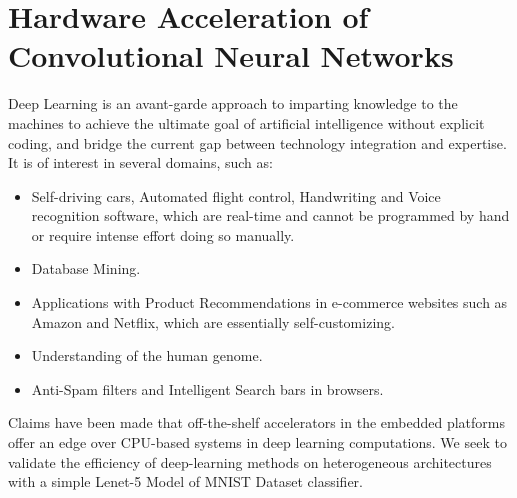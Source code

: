 \chapter{Hardware Acceleration of Convolutional Neural Networks}
\label{ch3_cnn}
Deep Learning is an avant-garde approach to imparting knowledge to the machines to achieve the ultimate goal of artificial intelligence without explicit coding, and bridge the current gap between technology integration and expertise. It is of interest in several domains\cite{wiki_ml}, such as:
\begin{itemize}
\item Self-driving cars, Automated flight control, Handwriting and Voice recognition software, which are real-time and cannot be programmed by hand or require intense effort doing so manually.
\item Database Mining.
\item Applications with Product Recommendations in e-commerce websites such as Amazon and Netflix, which are essentially self-customizing.
\item Understanding of the human genome.
\item Anti-Spam filters and Intelligent Search bars in browsers.
\end{itemize} 
Claims have been made that off-the-shelf accelerators in the embedded platforms offer an edge over CPU-based systems in deep learning computations\cite{hegde2016caffepresso}. We seek to validate the efficiency of deep-learning methods on heterogeneous architectures with a simple Lenet-5 Model of MNIST Dataset classifier. 

